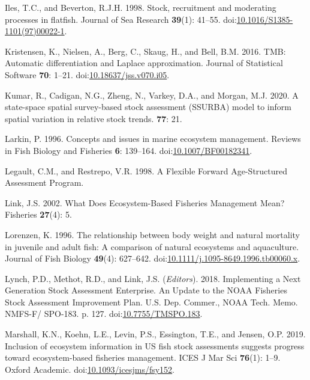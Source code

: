 \documentclass[]{article}
\begin{document}
\leavevmode\hypertarget{ref-iles1998Stock}{}%
Iles, T.C., and Beverton, R.J.H. 1998. Stock, recruitment and moderating
processes in flatfish. Journal of Sea Research \textbf{39}(1): 41--55.
doi:\href{https://doi.org/10.1016/S1385-1101(97)00022-1}{10.1016/S1385-1101(97)00022-1}.

\leavevmode\hypertarget{ref-kristensen2016TMB}{}%
Kristensen, K., Nielsen, A., Berg, C., Skaug, H., and Bell, B.M. 2016.
TMB: Automatic differentiation and Laplace approximation. Journal of
Statistical Software \textbf{70}: 1--21.
doi:\href{https://doi.org/10.18637/jss.v070.i05}{10.18637/jss.v070.i05}.

\leavevmode\hypertarget{ref-kumar2020Statespace}{}%
Kumar, R., Cadigan, N.G., Zheng, N., Varkey, D.A., and Morgan, M.J.
2020. A state-space spatial survey-based stock assessment (SSURBA) model
to inform spatial variation in relative stock trends. \textbf{77}: 21.

\leavevmode\hypertarget{ref-larkin1996Concepts}{}%
Larkin, P. 1996. Concepts and issues in marine ecosystem management.
Reviews in Fish Biology and Fisheries \textbf{6}: 139--164.
doi:\href{https://doi.org/10.1007/BF00182341}{10.1007/BF00182341}.

\leavevmode\hypertarget{ref-legault1998Flexible}{}%
Legault, C.M., and Restrepo, V.R. 1998. A Flexible Forward
Age-Structured Assessment Program.

\leavevmode\hypertarget{ref-link2002What}{}%
Link, J.S. 2002. What Does Ecosystem-Based Fisheries Management Mean?
Fisheries \textbf{27}(4): 5.

\leavevmode\hypertarget{ref-lorenzen1996Relationship}{}%
Lorenzen, K. 1996. The relationship between body weight and natural
mortality in juvenile and adult fish: A comparison of natural ecosystems
and aquaculture. Journal of Fish Biology \textbf{49}(4): 627--642.
doi:\href{https://doi.org/10.1111/j.1095-8649.1996.tb00060.x}{10.1111/j.1095-8649.1996.tb00060.x}.

\leavevmode\hypertarget{ref-lynch2018Implementing}{}%
Lynch, P.D., Methot, R.D., and Link, J.S. (\emph{Editors}). 2018.
Implementing a Next Generation Stock Assessment Enterprise. An Update to
the NOAA Fisheries Stock Assessment Improvement Plan. U.S. Dep. Commer.,
NOAA Tech. Memo. NMFS-F/ SPO-183. p. 127.
doi:\href{https://doi.org/10.7755/TMSPO.183}{10.7755/TMSPO.183}.

\leavevmode\hypertarget{ref-marshall2019Inclusion}{}%
Marshall, K.N., Koehn, L.E., Levin, P.S., Essington, T.E., and Jensen,
O.P. 2019. Inclusion of ecosystem information in US fish stock
assessments suggests progress toward ecosystem-based fisheries
management. ICES J Mar Sci \textbf{76}(1): 1--9. Oxford Academic.
doi:\href{https://doi.org/10.1093/icesjms/fsy152}{10.1093/icesjms/fsy152}.
\end{document}
